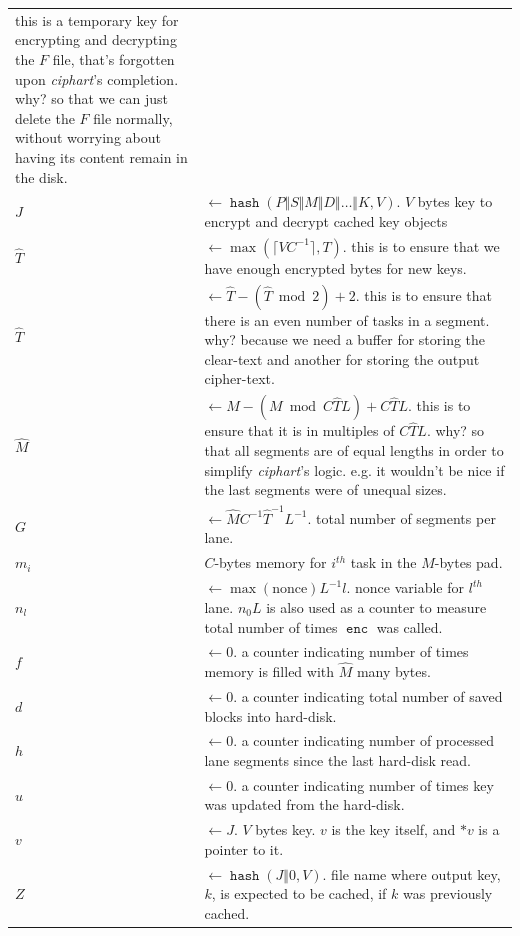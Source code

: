 \documentclass[twocolumn]{article}
\DeclareMathOperator{\enc}{\mathtt{enc}}
\DeclareMathOperator{\maxf}{max}
\DeclareMathOperator{\hash}{\mathtt{hash}}
\begin{document}
\begin{tabularx}{\columnwidth}{lX}
                    this is a temporary key for encrypting and decrypting
                    the $F$ file, that's forgotten upon \emph{ciphart}'s
                    completion.  why?  so that we can just delete the $F$
                    file normally, without worrying about having its
                    content remain in the disk.\\
    $J$         & $\gets \hash(P \Vert S \Vert M \Vert D \Vert \ldots
                    \Vert K, V)$.  $V$ bytes key to encrypt and decrypt
                    cached key objects\\
    $\hat T$    & $\gets \maxf(\lceil V C^{-1}\rceil, T)$.  this
                    is to ensure that we have enough encrypted bytes for
                    new keys.\\
    $\hat T$    & $\gets \hat T - (\hat T \bmod 2) + 2$.  this is to ensure
                    that there is an even number of tasks in a segment.
                    why?  because we need a buffer for storing the
                    clear-text and another for storing the output
                    cipher-text.\\
    $\hat M$    & $\gets M - (M \bmod C\hat TL) + C\hat TL$.  this is to
                    ensure that it is in multiples of $C\hat TL$.  why?  so
                    that all segments are of equal lengths in order to
                    simplify \emph{ciphart}'s logic.  e.g. it wouldn't be
                    nice if the last segments were of unequal sizes.\\
    $G$         & $\gets \hat MC^{-1}\hat T^{-1}L^{-1}$.  total number of
                    segments per lane.\\
    $m_i$       & $C$-bytes memory for $i^{th}$ task in the $\hat M$-bytes
                    pad.\\
    $n_l$       & $\gets \maxf(\text{nonce})L^{-1}l$.  nonce variable for
                    $l^{th}$ lane.  $n_0L$ is also used as a counter to
                    measure total number of times $\enc$ was called.\\
    $f$         & $\gets 0$.  a counter indicating number of times
                    memory is filled with $\hat M$ many bytes.\\
    $d$         & $\gets 0$.  a counter indicating total number of saved
                    blocks into hard-disk.\\
    $h$         & $\gets 0$.  a counter indicating number of processed lane
                    segments since the last hard-disk read.\\
    $u$         & $\gets 0$.  a counter indicating number of times key was
                    updated from the hard-disk.\\
    $v$         & $\gets J$.  $V$ bytes key.  $v$ is the key
                    itself, and $*v$ is a pointer to it.\\
    $Z$         & $\gets \hash(J \Vert 0, V)$.  file name where output key,
                    $k$, is expected to be cached, if $k$ was previously
                    cached.\\
\end{tabularx}
\end{document}
